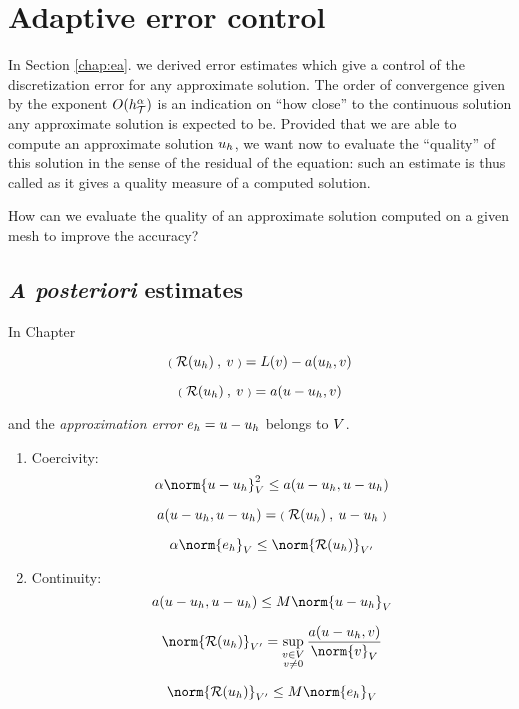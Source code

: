 
\chapter{Adaptive error control}\label{chap:aec}

In Section \ref{chap:ea}. we derived \apriori error estimates which give a control of the discretization error for any approximate solution.
The order of convergence given by the exponent $O(h_{\mathcal T}^\alpha)$ is an indication on ``how close'' to the continuous solution any approximate solution is expected to be.
Provided that we are able to compute an approximate solution ${u_h}$, we want now to evaluate the ``quality'' of this solution in the sense of the residual of the equation: such an estimate is thus called \aposteriori as it gives a quality measure of a computed solution.

\medskip
\Question How can we evaluate the quality of an approximate solution computed on a given mesh to improve the accuracy?

\section{\textit{A posteriori} estimates}

In Chapter



\[
{{\scriptstyle\mathbf{(}}\;{\mathcal{R}({u_h})}\:,\: v \;{\scriptstyle\mathbf{)}}} = L(v) - a({u_h},  v)
\]

\[
{{\scriptstyle\mathbf{(}}\;{\mathcal{R}({u_h})}\:,\: v \;{\scriptstyle\mathbf{)}}} = a(u - {u_h},  v)
\]

and the \textit{approximation error} $e_h = u - {u_h}$ belongs to ${V}$.


\begin{enumerate}
\item Coercivity:
\begin{equation}\label{eq:adapt_coercivity}
\alpha \norm{u - \uh}_{\xV}^2 \leq a(u - \uh,  u - \uh)
\end{equation}


\[
a(u - {u_h},  u - {u_h}) = {{\scriptstyle\mathbf{(}}\;{\mathcal{R}({u_h})}\:,\: u -{u_h} \;{\scriptstyle\mathbf{)}}}
\]

\begin{equation}\label{eq:adapt_lower}
\alpha \norm{e_h}_{\xV} \leq \norm{\Res{\uh}}_{\xV'}
\end{equation}


\item Continuity:
\begin{equation}\label{eq:adapt_continuity}
a(u - \uh,  u - \uh) \leq M \norm{u - \uh}_{\xV}
\end{equation}


\[
\norm{\Res{\uh}}_{\xV'} = \sup_{\substack{v\in\xV\\v\neq 0}} \dfrac{a(u - \uh, v)}{\norm{v}_\xV}
\]

\begin{equation}\label{eq:adapt_upper}
\norm{\Res{\uh}}_{\xV'} \leq M \norm{e_h}_{\xV}
\end{equation}


\end{enumerate}

